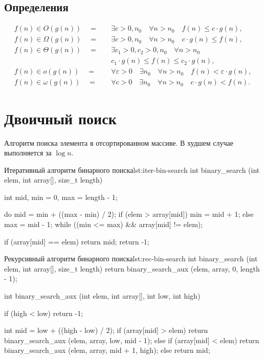 \subsection{Определения}
\begin{align}
  f(n) \in O(g(n)) \quad = \quad &\exists c > 0, n_0 \quad \forall n > n_0 \quad f(n) \leq c \cdot g(n),\\
  f(n) \in \Omega(g(n)) \quad = \quad &\exists c > 0, n_0 \quad \forall n > n_0 \quad c \cdot g(n) \leq f(n),\\
  f(n) \in \Theta(g(n)) \quad = \quad &\exists c_1 > 0, c_2 > 0, n_0 \quad \forall n > n_0 \nonumber\\
                                      &c_1 \cdot g(n) \leq f(n) \leq c_2 \cdot g(n),\\
  f(n) \in o(g(n)) \quad = \quad &\forall \varepsilon > 0 \quad \exists n_0 \quad \forall n > n_0 \quad f(n) < \varepsilon \cdot g(n),\\
  f(n) \in \omega(g(n)) \quad = \quad &\forall c > 0 \quad \exists n_0 \quad \forall n > n_0 \quad c \cdot g(n) < f(n).
\end{align}

\section{Двоичный поиск}
\label{sec:binary-search}

Алгоритм поиска элемента в отсортированном массиве. В худшем случае выполняется за $\log{n}$.

\begin{clst}{Итеративный алгоритм бинарного поиска}{lst:iter-bin-search}
int binary_search (int elem, int array[], size_t length) {
  int mid, min = 0, max = length - 1;

  do {
    mid = min + ((max - min) / 2);
    if (elem > array[mid])
      min = mid + 1;
    else
      max = mid - 1;
  } while ((min <= max) && array[mid] != elem);

  if (array[mid] == elem)
    return mid;
  return -1;
}
\end{clst}

\begin{clst}{Рекурсивный алгоритм бинарного поиска}{lst:rec-bin-search}
int binary_search (int elem, int array[], size_t length) {
  return binary_search_aux (elem, array, 0, length - 1);
}

int binary_search_aux (int elem, int array[], int low, int high) {
  if (high < low)
    return -1;

  int mid = low + ((high - low) / 2);
  if (array[mid] > elem)
    return binary_search_aux (elem, array, low, mid - 1);
  else {
    if (array[mid] < elem)
      return binary_search_aux (elem, array, mid + 1, high);
    else
      return mid;
  }
}
\end{clst}

